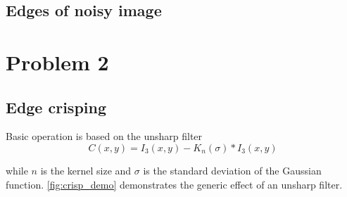\documentclass[12pt]{article}
\begin{document}
\subsection*{Edges of noisy image}

\section*{Problem 2}
\subsection*{Edge crisping}
Basic operation is based on the unsharp filter
\begin{equation}
	C(x, y) = I_3(x, y) - K_n(\sigma) \ast I_3(x, y)
\end{equation}

\noindent
while $n$ is the kernel size and $\sigma$ is the standard deviation of the Gaussian function.
\autoref{fig:crisp_demo} demonstrates the generic effect of an unsharp filter.
\end{document}
